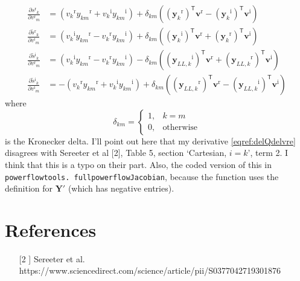 \documentclass{article}
\newcommand{\tran}{^{\mathsf{T}}}
\newcommand{\im}{\ensuremath{^{\mathrm{i}}}}
\newcommand{\re}{\ensuremath{^{\mathrm{r}}}}
\begin{document}
\begin{subequations}\label{eq:Jacobian_derivatives}
    \begin{align}
        \frac{\partial {s}\re_k}{\partial {v}\re_m} &= 
            \left(v_k\re y_{km}\re + v_k\im y_{km}\im\right)
            + \delta_{km}\left((\mathbf{y}_{k}\re)\tran\mathbf{v}\re - 
            (\mathbf{y}_{k}\im)\tran\mathbf{v}\im \right) 
             \\
        \frac{\partial \tilde{s}\re_k}{\partial {v}\im_m} &= 
            \left(v_k\im y_{km}\re - v_k\re y_{km}\im \right)
            + \delta_{km}\left((\mathbf{y}_{k}\im)\tran \mathbf{v}\re
                + (\mathbf{y}_{k}\re)\tran \mathbf{v}\im\right)
            \label{eqref:delPdelvim}\\
        \frac{\partial \tilde{s}\im_k}{\partial {v}\re_m} &= 
            \left(v_k\im y_{km}\re - v_k\re y_{km}\im\right)
            -\delta_{km}\left((\mathbf{y}_{LL,k}\im)\tran \mathbf{v}\re
                + (\mathbf{y}_{LL,k}\re)\tran \mathbf{v}\im \right)
            \label{eqref:delQdelvre} \\ 
        \frac{\partial \tilde{s}\im_k}{\partial {v}\im_m} &= 
            -\left(v_k\re y_{km}\re + v_k\im y_{km}\im\right)
            +\delta_{km}\left((\mathbf{y}_{LL,k}\re)\tran \mathbf{v}\re
                - (\mathbf{y}_{LL,k}\im)\tran \mathbf{v}\im\right)
    \end{align}
\end{subequations}
where 
$$ \delta_{km} = \begin{cases} 1, & k=m \\ 0, & \text{otherwise} \end{cases} $$
is the Kronecker delta. I'll point out here that my derivative 
\eqref{eqref:delQdelvre} disagrees with Sereeter et al [2], Table 5, section 
`Cartesian, $i=k$', term 2. I think that 
this is a typo on their part. Also, the coded version of this in 
\texttt{power{\textunderscore}flow{\textunderscore}tools.%
full{\textunderscore}power{\textunderscore}flow{\textunderscore}Jacobian}, 
because the function uses the definition for $\mathbf{Y}'$ (which has negative
entries).

\section*{References}
\begin{itemize}
    \item [[2]] Sereeter et al. 
    https://www.sciencedirect.com/science/article/pii/S0377042719301876
\end{itemize}
\end{document}
